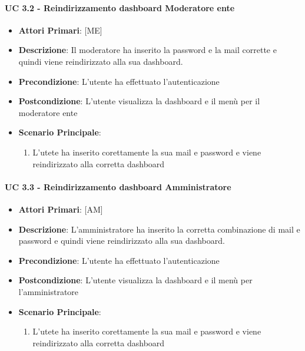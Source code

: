 			\paragraph{UC 3.2 - Reindirizzamento dashboard Moderatore ente}
			\begin{itemize}
				\item \textbf{Attori Primari}: [ME]
				\item \textbf{Descrizione}: Il moderatore ha inserito la password e la mail corrette e quindi viene reindirizzato alla sua dashboard.
				\item \textbf{Precondizione}: L'utente ha effettuato l'autenticazione
				\item \textbf{Postcondizione}: L'utente visualizza la dashboard e il menù per il moderatore ente
				\item \textbf{Scenario Principale}:
				\begin{enumerate}
					\item{L'utete ha inserito corettamente la sua mail e password e viene reindirizzato alla corretta dashboard}
					
				\end{enumerate}	
			\end{itemize}

			\paragraph{UC 3.3 - Reindirizzamento dashboard Amministratore}
			\begin{itemize}
				\item \textbf{Attori Primari}: [AM]
				\item \textbf{Descrizione}: L'amministratore ha inserito la corretta combinazione di mail e password e quindi viene reindirizzato alla sua dashboard.
				\item \textbf{Precondizione}: L'utente ha effettuato l'autenticazione
				\item \textbf{Postcondizione}: L'utente visualizza la dashboard  e il menù per l'amministratore
				\item \textbf{Scenario Principale}:
				\begin{enumerate}
					\item{L'utete ha inserito corettamente la sua mail e password e viene reindirizzato alla corretta dashboard}
					
				\end{enumerate}	
			\end{itemize}

